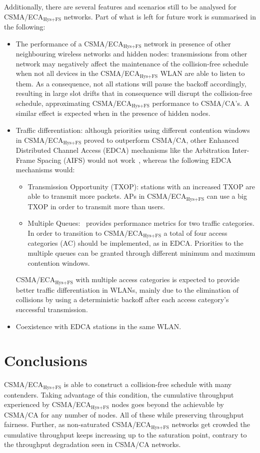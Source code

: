 \documentclass[a4paper,journal]{IEEEtran}
\begin{document}
Additionally, there are several features and scenarios still to be analysed for CSMA/ECA$_{\text{Hys+FS}}$ networks. Part of what is left for future work is summarised in the following:

\begin{itemize}
	\item The performance of a CSMA/ECA$_{\text{Hys+FS}}$ network in presence of other neighbouring wireless networks and hidden nodes: transmissions from other network may negatively affect the maintenance of the collision-free schedule when not all devices in the CSMA/ECA$_{\text{Hys+FS}}$ WLAN are able to listen to them. As a consequence, not all stations will pause the backoff accordingly, resulting in large slot drifts that in consequence will disrupt the collision-free schedule, approximating CSMA/ECA$_{\text{Hys+FS}}$ performance to CSMA/CA's. A similar effect is expected when in the presence of hidden nodes.
	\item Traffic differentiation: although priorities using different contention windows in CSMA/ECA$_{\text{Hys+FS}}$ proved to outperform CSMA/CA, other Enhanced Distributed Channel Access (EDCA) mechanisms like the Arbitration Inter-Frame Spacing (AIFS) would not work~\cite{jaumeTD}, whereas the following EDCA mechanisms would:
	\begin{itemize}
		\item Transmission Opportunity (TXOP): stations with an increased TXOP are able to transmit more packets. APs in CSMA/ECA$_{\text{Hys+FS}}$ can use a big TXOP in order to transmit more than users.
		\item Multiple Queues:~\cite{jaumeTD} provides performance metrics for two traffic categories. In order to transition to CSMA/ECA$_{\text{Hys+FS}}$ a total of four access categories (AC) should be implemented, as in EDCA. Priorities to the multiple queues can be granted through different minimum and maximum contention windows.
	\end{itemize}
	CSMA/ECA$_{\text{Hys+FS}}$ with multiple access categories is expected to provide better traffic differentiation in WLANs, mainly due to the elimination of collisions by using a deterministic backoff after each access category's successful transmission.
	\item Coexistence with EDCA stations in the same WLAN.
\end{itemize}

\section{Conclusions}\label{conclusions}
CSMA/ECA$_{\text{Hys+FS}}$ is able to construct a collision-free schedule with many contenders. Taking advantage of this condition, the cumulative throughput experienced by CSMA/ECA$_{\text{Hys+FS}}$ nodes goes beyond the achievable by CSMA/CA for any number of nodes. All of these while preserving throughput fairness. Further, as non-saturated CSMA/ECA$_{\text{Hys+FS}}$ networks get crowded the cumulative throughput keeps increasing up to the saturation point, contrary to the throughput degradation seen in CSMA/CA networks.
\end{document}
